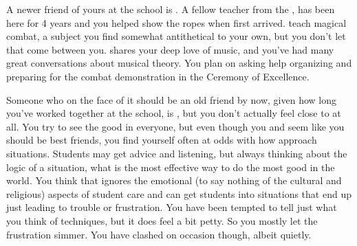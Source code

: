 \documentclass[char]{GL2020}
\begin{document}
A newer friend of yours at the school is \cInterpol{\intro}. A fellow teacher from the \pFarm{}, \cInterpol{} has been here for 4 years and you helped show \cInterpol{\them} the ropes when \cInterpol{\they} first arrived. \cInterpol{\They} teach\cInterpol{\verbes} magical combat, a subject you find somewhat antithetical to your own, but you don't let that come between you. \cInterpol{} shares your deep love of music, and you've had many great conversations about musical theory. You plan on asking \cInterpol{\their} help organizing and preparing for the combat demonstration in the Ceremony of Excellence.

Someone who on the face of it should be an old friend by now, given how long you’ve worked together at the school, is \cEthics{}, but you don’t actually feel close to \cEthics{\them} at all. You try to see the good in everyone, but even though you and \cEthics{} seem like you should be best friends, you find yourself often at odds with how \cEthics{\they} approach\cEthics{\verbes} situations. Students may get advice and listening, but \cEthics{\theyare} always thinking about the logic of a situation, what is the most effective way to do the most good in the world. You think that \cEthics{} ignores the emotional (to say nothing of the cultural and religious) aspects of student care and can get students into situations that end up just leading to trouble or frustration. You have been tempted to tell \cEthics{\them} just what you think of \cEthics{\their} techniques, but it does feel a bit petty. So you mostly let the frustration simmer. You have clashed on occasion though, albeit quietly.
\end{document}
